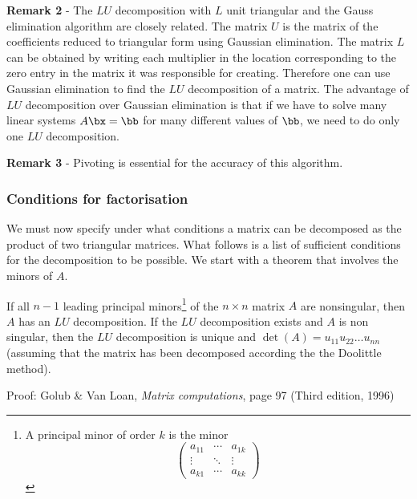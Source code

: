 \noindent \textbf{Remark 2} - The $LU$ decomposition with $L$ unit
triangular and  the  Gauss elimination algorithm are  closely related.
The matrix $U$ is the matrix of the coefficients reduced to triangular
form using Gaussian  elimination.  The matrix  $L$ can be obtained  by
writing  each multiplier in   the location corresponding  to  the zero
entry in the matrix it was responsible for creating.   Therefore one
can use Gaussian elimination to find the $LU$ decomposition of a
matrix.   The advantage of $LU$ decomposition over Gaussian elimination
is that if we have to solve many linear systems $A \bx = \bb$ for many
different values of $\bb$, we need to do only one $LU$ decomposition.

\noindent \textbf{Remark 3} - Pivoting is essential for the accuracy
of this algorithm.

\subsubsection{Conditions for factorisation}

We must now specify under what conditions a matrix can be decomposed
as the product of two triangular matrices.  What follows is a list of
sufficient conditions for the decomposition to be possible.  We start
with a theorem that involves the minors of $A$.

\smallskip

\begin{theorem}
\label{LUexists}
If all $n-1$ leading principal minors\footnote{A principal minor of
order $k$ is the minor
%
\begin{equation*}
  \begin{pmatrix}
    a_{1 1} & \cdots & a_{1 k} \\
    \vdots & \ddots & \vdots \\
    a_{k 1} & \cdots & a_{k k}
  \end{pmatrix}
\end{equation*}
%
} of the   $n \times n$  matrix  $A$ are nonsingular,  then  $A$ has an
$LU$ decomposition.   If the $LU$ decomposition exists and $A$ is non
singular, then the $LU$ decomposition is unique and $\det(A)=u_{11}
u_{22} \ldots u_{nn}$ (assuming that the matrix has been decomposed
according the the Doolittle method).
\end{theorem}

\noindent Proof: Golub \& Van Loan, \textit{Matrix computations}, page
97 (Third edition, 1996)

\smallskip


